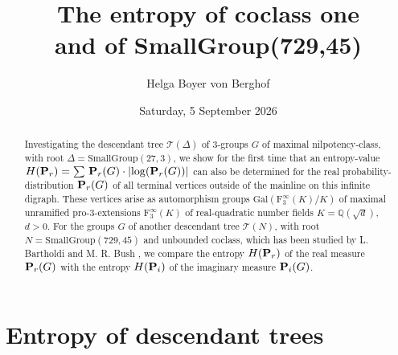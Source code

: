 \documentclass{amsart}
\theoremstyle{definition}
\theoremstyle{remark}
\begin{document}
\title[The entropy of coclass one]{The entropy of coclass one \\ and of SmallGroup(729,45)}

\author{Helga Boyer von Berghof}
\address{Krenngasse 43\\8010 Graz\\Austria}



\date{Saturday, 5 September 2026}


\begin{abstract}
Investigating the descendant tree \(\mathcal{T}(\Delta)\) of \(3\)-groups \(G\) of maximal nilpotency-class,
with root \(\Delta=\mathrm{SmallGroup}(27,3)\),
we show for the first time that an entropy-value
\(H({\bf P}_r)=\sum\,{\bf P}_r(G)\cdot\lvert\log({\bf P}_r(G))\rvert\)
can also be determined for the real probability-distribution
\({\bf P}_r(G)\)
of all terminal vertices outside of the mainline on this infinite digraph.
These vertices arise as automorphism groups
\(\mathrm{Gal}(\mathrm{F}_3^\infty(K)/K)\)
of maximal unramified pro-\(3\)-extensions
\(\mathrm{F}_3^\infty(K)\)
of real-quadratic number fields
\(K=\mathbb{Q}(\sqrt{d})\), \(d>0\).
For the groups \(G\) of another descendant tree \(\mathcal{T}(N)\),
with root \(N=\mathrm{SmallGroup}(729,45)\)
and unbounded coclass,
which has been studied by L. Bartholdi and M. R. Bush
\cite{BaBu2007},
we compare the entropy \(H({\bf P}_r)\) of the real measure \({\bf P}_r(G)\)
with the entropy \(H({\bf P}_i)\) of the imaginary measure \({\bf P}_i(G)\).
\end{abstract}

\maketitle


\section{Entropy of descendant trees}
\label{s:Entropy}
\end{document}
